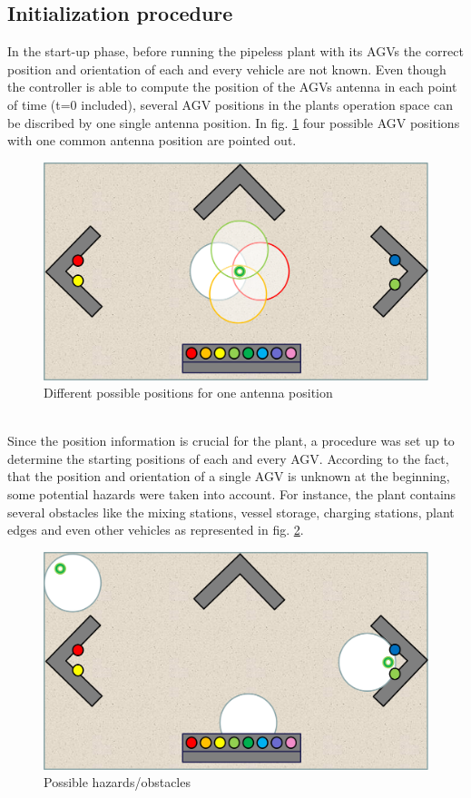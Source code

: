 \subsection{Initialization procedure}
In the start-up phase, before running the pipeless plant with its AGVs the correct position and orientation of each and every vehicle are not known. Even though the controller is able to compute the position of the AGVs antenna in each point of time (t=0 included),  several AGV positions in the plants operation space can be discribed by one single antenna position. In fig. \ref{possible_initial_positions} four possible AGV positions with one common antenna position are pointed out. \\
\begin{figure}[!htbp]
\centering
\includegraphics[width = 16cm]{Pictures/possible_initial_positions}
\caption{Different possible positions for one antenna position}
\label{possible_initial_positions}
\end{figure}\\
Since the position information is crucial for the plant, a procedure was set up to determine the starting positions of each and every AGV.
According to the fact, that the position and orientation of a single AGV is unknown at the beginning, some potential hazards were taken into account. For instance, the plant contains several obstacles like the mixing stations, vessel storage, charging stations, plant edges and even other vehicles as represented in fig. \ref{hazards}.\pagebreak
\begin{figure}[!htbp]
\centering
\includegraphics[width = 16cm]{Pictures/hazards}
\caption{Possible hazards/obstacles}
\label{hazards}
\end{figure}\\
